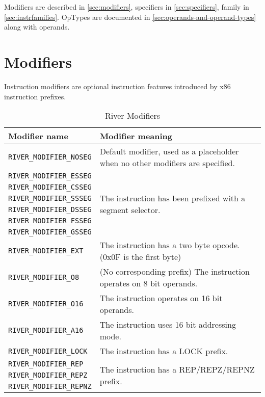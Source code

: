 \documentclass[12pt]{report}
\begin{document}
Modifiers are described in \autoref{sec:modifiers}, specifiers in \autoref{sec:specifiers}, family in \autoref{sec:instrfamilies}. OpTypes are documented in \autoref{sec:operands-and-operand-types} along with operands.

\section{Modifiers}
\label{sec:modifiers}
Instruction modifiers are optional instruction features introduced by x86 instruction prefixes.\\
\begin{table}[H]
	\begin{tabular}{| p{6cm} | p{10cm} |}
		\hline
		\textbf{Modifier name} & \textbf{Modifier meaning}\\ \hline
		\texttt{RIVER\_MODIFIER\_NOSEG} & Default modifier, used as a placeholder when no other modifiers are specified.\\ \hline
		\texttt{RIVER\_MODIFIER\_ESSEG} & \multirow{6}{*}{The instruction has been prefixed with a segment selector.} \\
		\texttt{RIVER\_MODIFIER\_CSSEG} &\\
		\texttt{RIVER\_MODIFIER\_SSSEG} &\\
		\texttt{RIVER\_MODIFIER\_DSSEG} &\\
		\texttt{RIVER\_MODIFIER\_FSSEG} &\\
		\texttt{RIVER\_MODIFIER\_GSSEG} &\\ \hline
		\texttt{RIVER\_MODIFIER\_EXT} & The instruction has a two byte opcode. (0x0F is the first byte)\\ \hline
		\texttt{RIVER\_MODIFIER\_O8} & (No corresponding prefix) The instruction operates on 8 bit operands.\\ \hline
		\texttt{RIVER\_MODIFIER\_O16} & The instruction operates on 16 bit operands.\\ \hline
		\texttt{RIVER\_MODIFIER\_A16} & The instruction uses 16 bit addressing mode.\\ \hline
		\texttt{RIVER\_MODIFIER\_LOCK} & The instruction has a LOCK prefix.\\ \hline
		\texttt{RIVER\_MODIFIER\_REP} & \multirow{3}{*}{The instruction has a REP/REPZ/REPNZ prefix.}\\
		\texttt{RIVER\_MODIFIER\_REPZ} &\\
		\texttt{RIVER\_MODIFIER\_REPNZ} &\\ \hline
	\end{tabular}
	\caption{River Modifiers}
	\label{table:river-modifiers}
\end{table}
\end{document}

